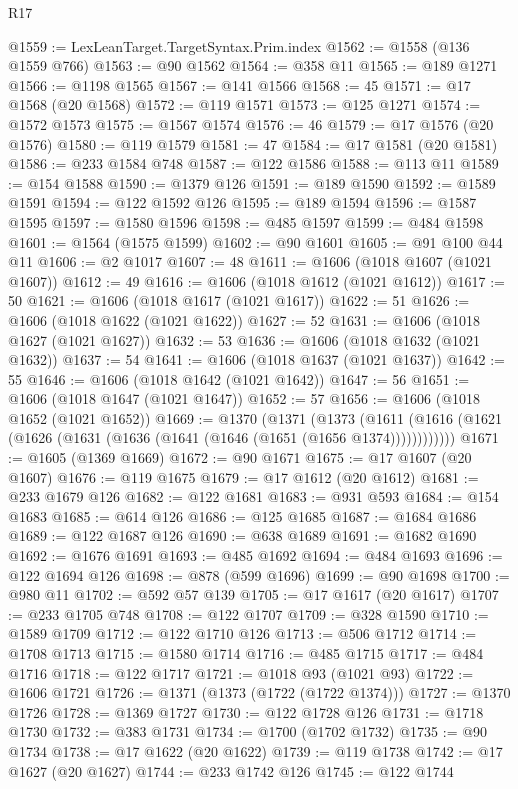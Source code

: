 \begin{lexlean}{R17}
\begin{coremodule}
@1559 := LexLeanTarget.TargetSyntax.Prim.index
@1562 := @1558 (@136 @1559 @766)
@1563 := @90 @1562
@1564 := @358 @11
@1565 := @189 @1271
@1566 := @1198 @1565
@1567 := @141 @1566
@1568 := 45
@1571 := @17 @1568 (@20 @1568)
@1572 := @119 @1571
@1573 := @125 @1271
@1574 := @1572 @1573
@1575 := @1567 @1574
@1576 := 46
@1579 := @17 @1576 (@20 @1576)
@1580 := @119 @1579
@1581 := 47
@1584 := @17 @1581 (@20 @1581)
@1586 := @233 @1584 @748
@1587 := @122 @1586
@1588 := @113 @11
@1589 := @154 @1588
@1590 := @1379 @126
@1591 := @189 @1590
@1592 := @1589 @1591
@1594 := @122 @1592 @126
@1595 := @189 @1594
@1596 := @1587 @1595
@1597 := @1580 @1596
@1598 := @485 @1597
@1599 := @484 @1598
@1601 := @1564 (@1575 @1599)
@1602 := @90 @1601
@1605 := @91 @100 @44 @11
@1606 := @2 @1017
@1607 := 48
@1611 := @1606 (@1018 @1607 (@1021 @1607))
@1612 := 49
@1616 := @1606 (@1018 @1612 (@1021 @1612))
@1617 := 50
@1621 := @1606 (@1018 @1617 (@1021 @1617))
@1622 := 51
@1626 := @1606 (@1018 @1622 (@1021 @1622))
@1627 := 52
@1631 := @1606 (@1018 @1627 (@1021 @1627))
@1632 := 53
@1636 := @1606 (@1018 @1632 (@1021 @1632))
@1637 := 54
@1641 := @1606 (@1018 @1637 (@1021 @1637))
@1642 := 55
@1646 := @1606 (@1018 @1642 (@1021 @1642))
@1647 := 56
@1651 := @1606 (@1018 @1647 (@1021 @1647))
@1652 := 57
@1656 := @1606 (@1018 @1652 (@1021 @1652))
@1669 := @1370
    (@1371
      (@1373 (@1611 (@1616 (@1621 (@1626 (@1631 (@1636 (@1641 (@1646 (@1651 (@1656 @1374))))))))))))
@1671 := @1605 (@1369 @1669)
@1672 := @90 @1671
@1675 := @17 @1607 (@20 @1607)
@1676 := @119 @1675
@1679 := @17 @1612 (@20 @1612)
@1681 := @233 @1679 @126
@1682 := @122 @1681
@1683 := @931 @593
@1684 := @154 @1683
@1685 := @614 @126
@1686 := @125 @1685
@1687 := @1684 @1686
@1689 := @122 @1687 @126
@1690 := @638 @1689
@1691 := @1682 @1690
@1692 := @1676 @1691
@1693 := @485 @1692
@1694 := @484 @1693
@1696 := @122 @1694 @126
@1698 := @878 (@599 @1696)
@1699 := @90 @1698
@1700 := @980 @11
@1702 := @592 @57 @139
@1705 := @17 @1617 (@20 @1617)
@1707 := @233 @1705 @748
@1708 := @122 @1707
@1709 := @328 @1590
@1710 := @1589 @1709
@1712 := @122 @1710 @126
@1713 := @506 @1712
@1714 := @1708 @1713
@1715 := @1580 @1714
@1716 := @485 @1715
@1717 := @484 @1716
@1718 := @122 @1717
@1721 := @1018 @93 (@1021 @93)
@1722 := @1606 @1721
@1726 := @1371 (@1373 (@1722 (@1722 @1374)))
@1727 := @1370 @1726
@1728 := @1369 @1727
@1730 := @122 @1728 @126
@1731 := @1718 @1730
@1732 := @383 @1731
@1734 := @1700 (@1702 @1732)
@1735 := @90 @1734
@1738 := @17 @1622 (@20 @1622)
@1739 := @119 @1738
@1742 := @17 @1627 (@20 @1627)
@1744 := @233 @1742 @126
@1745 := @122 @1744

\end{coremodule}
\end{lexlean}
